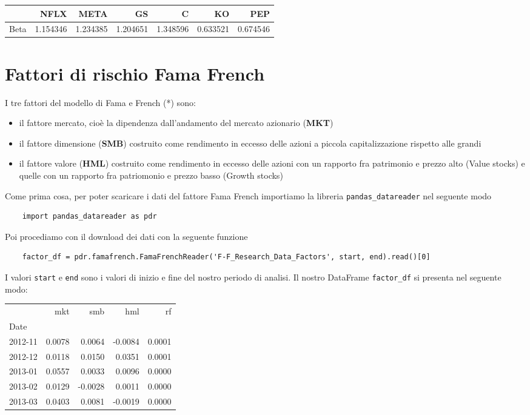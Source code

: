 \documentclass{report}
\begin{document}
\begin{tabular}{lrrrrrr}
\toprule
{} &     NFLX &     META &      GS &        C &       KO &      PEP \\
\midrule
Beta &  1.154346 &  1.234385 &  1.204651 &  1.348596 &  0.633521 &  0.674546 \\

\bottomrule
\end{tabular}

\section{Fattori di rischio Fama French}

I tre fattori del modello di Fama e French (*) sono:
\begin{itemize}[leftmargin=30pt, rightmargin=2cm]
\item il fattore mercato, cioè la dipendenza dall'andamento del mercato azionario (\textbf{MKT})
\item il fattore dimensione (\textbf{SMB}) costruito come rendimento in eccesso delle azioni a piccola capitalizzazione rispetto alle grandi
\item il fattore valore (\textbf{HML}) costruito come rendimento in eccesso delle azioni con un rapporto fra patrimonio e prezzo alto (Value stocks) e quelle con un rapporto fra patriomonio e prezzo basso (Growth stocks)
\end{itemize}
Come prima cosa, per poter scaricare i dati del fattore Fama French importiamo la libreria \lstinline{pandas_datareader} nel seguente modo
\begin{lstlisting}
    import pandas_datareader as pdr
\end{lstlisting}
Poi procediamo con il download dei dati con la seguente funzione
\begin{lstlisting}
    factor_df = pdr.famafrench.FamaFrenchReader('F-F_Research_Data_Factors', start, end).read()[0]
\end{lstlisting}

I valori \lstinline{start} e \lstinline{end} sono i valori di inizio e fine del nostro periodo di analisi. Il nostro DataFrame \lstinline{factor_df} si presenta nel seguente modo:

\begin{tabular}{lrrrr}
\toprule
{} &     mkt &     smb &     hml &      rf \\
Date    &         &         &         &         \\
\midrule
2012-11 &  0.0078 &  0.0064 & -0.0084 &  0.0001 \\
2012-12 &  0.0118 &  0.0150 &  0.0351 &  0.0001 \\
2013-01 &  0.0557 &  0.0033 &  0.0096 &  0.0000 \\
2013-02 &  0.0129 & -0.0028 &  0.0011 &  0.0000 \\
2013-03 &  0.0403 &  0.0081 & -0.0019 &  0.0000 \\
\bottomrule
\end{tabular}
\end{document}
